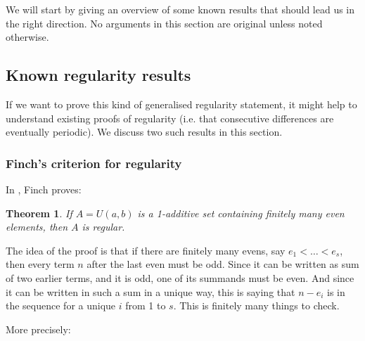 \documentclass{article}
\newtheorem{theorem}{Theorem}[section]
\theoremstyle{definition}
\theoremstyle{remark}
\numberwithin{equation}{section}
\begin{document}
We will start by giving an overview of some known results that should
lead us in the right direction.  No arguments in this section are
original unless noted otherwise.

\subsection{Known regularity results}

If we want to prove this kind of generalised regularity statement, it
might help to understand existing proofs of regularity (i.e. that
consecutive differences are eventually periodic).  We discuss two such
results in this section.

\subsubsection{Finch's criterion for regularity}

In \cite{finch:em1992}, Finch proves:

\begin{theorem}
If $A = U(a,b)$ is a 1-additive set containing finitely many even
elements, then $A$ is regular.  
\end{theorem}

The idea of the proof is that if there are finitely many evens, say
$e_1 < \ldots < e_s$, then every term $n$ after the last even must be
odd.  Since it can be written as sum of two earlier terms, and it is
odd, one of its summands must be even.  And since it can be written in
such a sum in a unique way, this is saying that $n - e_i$ is in the
sequence for a unique $i$ from 1 to $s$.  This is finitely many things
to check.

More precisely:
\end{document}
